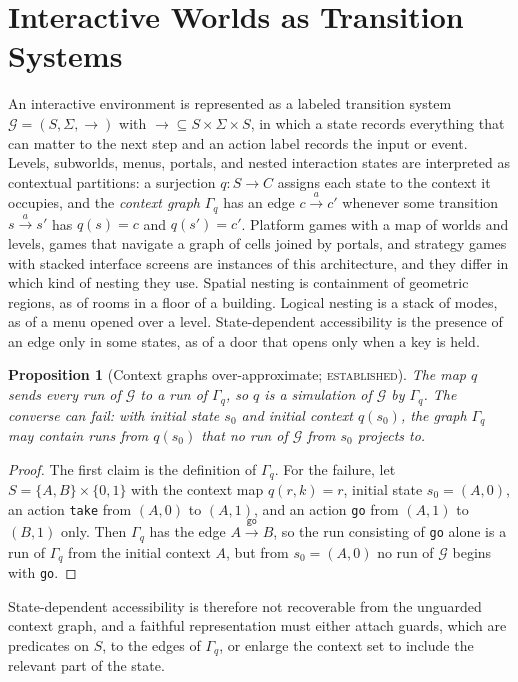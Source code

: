 \documentclass[11pt]{article}
\newtheorem{proposition}[theorem]{Proposition}
\theoremstyle{definition}
\theoremstyle{remark}
\newcommand{\stE}{\textsc{established}}
\begin{document}
\section{Interactive Worlds as Transition Systems}

An interactive environment is represented as a labeled transition system $\mathcal G=(S,\Sigma,\longrightarrow)$ with $\longrightarrow\subseteq S\times\Sigma\times S$, in which a state records everything that can matter to the next step and an action label records the input or event. Levels, subworlds, menus, portals, and nested interaction states are interpreted as contextual partitions: a surjection $q:S\to C$ assigns each state to the context it occupies, and the \emph{context graph} $\Gamma_q$ has an edge $c\xrightarrow{a}c'$ whenever some transition $s\xrightarrow{a}s'$ has $q(s)=c$ and $q(s')=c'$. Platform games with a map of worlds and levels, games that navigate a graph of cells joined by portals, and strategy games with stacked interface screens are instances of this architecture, and they differ in which kind of nesting they use. Spatial nesting is containment of geometric regions, as of rooms in a floor of a building. Logical nesting is a stack of modes, as of a menu opened over a level. State-dependent accessibility is the presence of an edge only in some states, as of a door that opens only when a key is held.

\begin{proposition}[Context graphs over-approximate; \stE]\label{prop:overapprox}
The map $q$ sends every run of $\mathcal G$ to a run of $\Gamma_q$, so $q$ is a simulation of $\mathcal G$ by $\Gamma_q$. The converse can fail: with initial state $s_0$ and initial context $q(s_0)$, the graph $\Gamma_q$ may contain runs from $q(s_0)$ that no run of $\mathcal G$ from $s_0$ projects to.
\end{proposition}
\begin{proof}
The first claim is the definition of $\Gamma_q$. For the failure, let $S=\{A,B\}\times\{0,1\}$ with the context map $q(r,k)=r$, initial state $s_0=(A,0)$, an action \texttt{take} from $(A,0)$ to $(A,1)$, and an action \texttt{go} from $(A,1)$ to $(B,1)$ only. Then $\Gamma_q$ has the edge $A\xrightarrow{\texttt{go}}B$, so the run consisting of \texttt{go} alone is a run of $\Gamma_q$ from the initial context $A$, but from $s_0=(A,0)$ no run of $\mathcal G$ begins with \texttt{go}.
\end{proof}

State-dependent accessibility is therefore not recoverable from the unguarded context graph, and a faithful representation must either attach guards, which are predicates on $S$, to the edges of $\Gamma_q$, or enlarge the context set to include the relevant part of the state.
\end{document}
